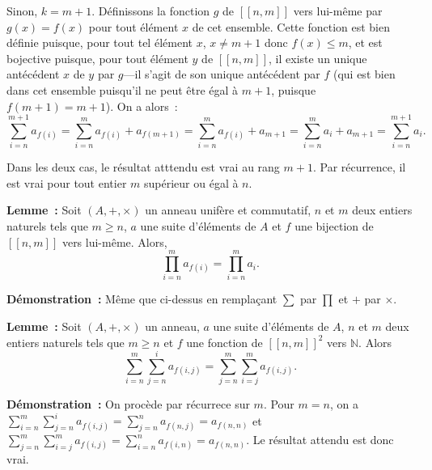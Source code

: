     Sinon, $k = m+1$. 
    Définissons la fonction $g$ de $[\![n, m]\!]$ vers lui-même par $g(x) = f(x)$ pour tout élément $x$ de cet ensemble. 
    Cette fonction est bien définie puisque, pour tout tel élément $x$, $x \neq m+1$ donc $f(x) \leq m$, et est bojective puisque, pour tout élément $y$ de $[\![n, m]\!]$, il existe un unique antécédent $x$ de $y$ par $g$—il s'agit de son unique antécédent par $f$ (qui est bien dans cet ensemble puisqu'il ne peut être égal à $m+1$, puisque $f(m+1) = m+1$). 
    On a alors : 
    \begin{equation*}
        \sum_{i=n}^{m+1} a_{f(i)}
        = \sum_{i=n}^m a_{f(i)} + a_{f(m+1)}
        = \sum_{i=n}^m a_{f(i)} + a_{m+1}
        = \sum_{i=n}^m a_{i} + a_{m+1}
        = \sum_{i=n}^{m+1} a_{i}.
    \end{equation*}

    Dans les deux cas, le résultat atttendu est vrai au rang $m+1$.
    Par récurrence, il est vrai pour tout entier $m$ supérieur ou égal à $n$.

    \done

\medskip

\noindent\textbf{Lemme :} Soit $(A, +, \times)$ un anneau unifère et commutatif, $n$ et $m$ deux entiers naturels tels que $m \geq n$, $a$ une suite d'éléments de $A$ et $f$ une bijection de $[\![n, m]\!]$ vers lui-même. 
    Alors,
    \begin{equation*}
        \prod_{i=n}^m a_{f(i)} = \prod_{i=n}^m a_i.
    \end{equation*}

\medskip

\noindent\textbf{Démonstration :} Même que ci-dessus en remplaçant $\sum$ par $\prod$ et $+$ par $\times$.

\medskip

\noindent\textbf{Lemme :} Soit $(A, +, \times)$ un anneau, $a$ une suite d'éléments de $A$, $n$ et $m$ deux entiers naturels tels que $m \geq n$ et $f$ une fonction de $[\![n, m]\!]^2$ vers $\mathbb{N}$.
    Alors
    \begin{equation*}
        \sum_{i=n}^m \sum_{j=n}^i a_{f(i,j)}
             = \sum_{j=n}^m \sum_{i=j}^m a_{f(i,j)} .
    \end{equation*}

\medskip

\noindent\textbf{Démonstration :} On procède par récurrece sur $m$. 
    Pour $m = n$, on a $\sum_{i=n}^m \sum_{j=n}^i a_{f(i,j)} = \sum_{j=n}^n a_{f(n,j)} = a_{f(n,n)}$ et $\sum_{j=n}^m \sum_{i=j}^m a_{f(i,j)} = \sum_{i=n}^n a_{f(i,n)} = a_{f(n,n)}$.
    Le résultat attendu est donc vrai. 

